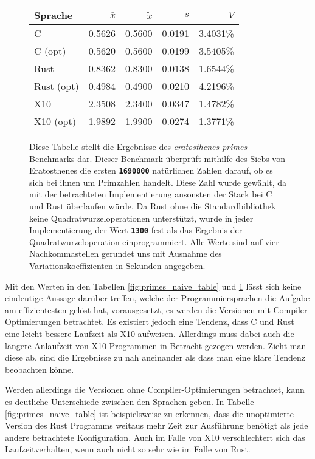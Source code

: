 \begin{figure}[hb]
	\begin{center}
		\begin{tabular}{lrrrr}
			\toprule
			Sprache    & $\bar{x}$ & $\tilde{x}$ & $s$ & $V$ \\
			\midrule
			C          & 0.5626 & 0.5600 & 0.0191 & 3.4031\% \\
			C (opt)    & 0.5620 & 0.5600 & 0.0199 & 3.5405\% \\
			Rust       & 0.8362 & 0.8300 & 0.0138 & 1.6544\% \\
			Rust (opt) & 0.4984 & 0.4900 & 0.0210 & 4.2196\% \\
			X10        & 2.3508 & 2.3400 & 0.0347 & 1.4782\% \\
			X10 (opt)  & 1.9892 & 1.9900 & 0.0274 & 1.3771\% \\
			\bottomrule
		\end{tabular}
	\end{center}
	\caption{
		Diese Tabelle stellt die Ergebnisse des \textit{eratosthenes-primes}-Benchmarks dar.
		Dieser Benchmark überprüft mithilfe des Siebs von Eratosthenes die ersten \texttt{\textsc{\textbf{1690000}}}
		natürlichen Zahlen darauf, ob es sich bei ihnen um Primzahlen handelt. Diese Zahl wurde gewählt,
		da mit der betrachteten Implementierung ansonsten der Stack bei C und Rust überlaufen würde.
		Da Rust ohne die Standardbibliothek keine Quadratwurzeloperationen
		unterstützt, wurde in jeder Implementierung der Wert \texttt{\textsc{\textbf{1300}}} fest als das Ergebnis
		der Quadratwurzeloperation einprogrammiert.
		Alle Werte sind auf vier Nachkommastellen gerundet uns mit Ausnahme des Variationskoeffizienten
		in Sekunden angegeben.
	}
	\label{fig:primes_eratosthenes_table}
\end{figure}

Mit den Werten in den Tabellen \ref{fig:primes_naive_table} und \ref{fig:primes_eratosthenes_table} lässt sich keine
eindeutige Aussage darüber treffen, welche der Programmiersprachen die Aufgabe am effizientesten
gelöst hat, vorausgesetzt, es werden die Versionen mit Compiler-Optimierungen betrachtet. Es existiert
jedoch eine Tendenz, dass C und Rust eine leicht bessere Laufzeit als X10 aufweisen.
Allerdings muss dabei auch die längere Anlaufzeit von X10 Programmen in Betracht gezogen werden.
Zieht man diese ab, sind die Ergebnisse zu nah aneinander als dass man eine klare Tendenz beobachten könne.

Werden allerdings die Versionen ohne Compiler-Optimierungen betrachtet, kann es deutliche Unterschiede zwischen den
Sprachen geben. In Tabelle \ref{fig:primes_naive_table} ist beispielsweise zu erkennen, dass die unoptimierte
Version des Rust Programms weitaus mehr Zeit zur Ausführung benötigt als jede andere betrachtete
Konfiguration. Auch im Falle von X10 verschlechtert sich das Laufzeitverhalten, wenn auch nicht so
sehr wie im Falle von Rust.

